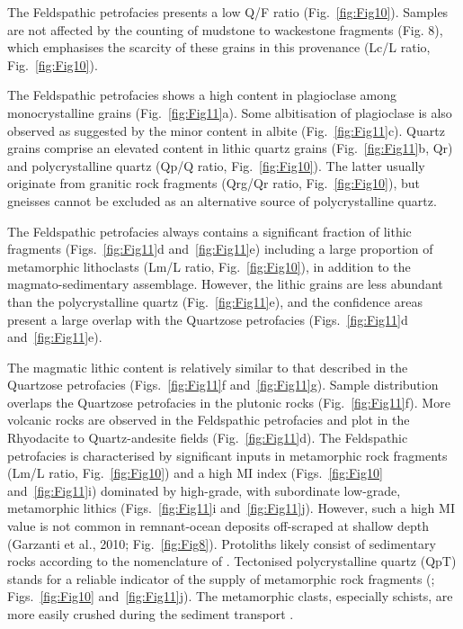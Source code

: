 \documentclass[twoside]{article}
\begin{document}
The Feldspathic petrofacies presents a low Q/F ratio (Fig.~\ref{fig:Fig10}). Samples are not affected by the counting of mudstone to wackestone fragments (Fig. 8), which emphasises the scarcity of these grains in this provenance (Lc/L ratio, Fig.~\ref{fig:Fig10}).\par
\medskip
The Feldspathic petrofacies shows a high content in plagioclase among monocrystalline grains (Fig.~\ref{fig:Fig11}a). Some albitisation of plagioclase \citep{Morad2000} is also observed as suggested by the minor content in albite (Fig.~\ref{fig:Fig11}c). Quartz grains comprise an elevated content in lithic quartz grains (Fig.~\ref{fig:Fig11}b, Qr) and polycrystalline quartz (Qp/Q ratio, Fig.~\ref{fig:Fig10}). The latter usually originate from granitic rock fragments (Qrg/Qr ratio, Fig.~\ref{fig:Fig10}), but gneisses cannot be excluded as an alternative source of polycrystalline quartz.\par
\medskip
The Feldspathic petrofacies always contains a significant fraction of lithic fragments (Figs.~\ref{fig:Fig11}d and~\ref{fig:Fig11}e) including a large proportion of metamorphic lithoclasts (Lm/L ratio, Fig.~\ref{fig:Fig10}), in addition to the magmato-sedimentary assemblage. However, the lithic grains are less abundant than the polycrystalline quartz (Fig.~\ref{fig:Fig11}e), and the confidence areas present a large overlap with the Quartzose petrofacies (Figs.~\ref{fig:Fig11}d and~\ref{fig:Fig11}e).\par
\medskip
The magmatic lithic content is relatively similar to that described in the Quartzose petrofacies (Figs.~\ref{fig:Fig11}f and~\ref{fig:Fig11}g). Sample distribution overlaps the Quartzose petrofacies in the plutonic rocks (Fig.~\ref{fig:Fig11}f). More volcanic rocks are observed in the Feldspathic petrofacies and plot in the Rhyodacite to Quartz-andesite fields (Fig.~\ref{fig:Fig11}d). The Feldspathic petrofacies is characterised by significant inputs in metamorphic rock fragments (Lm/L ratio, Fig.~\ref{fig:Fig10}) and a high MI index (Figs.~\ref{fig:Fig10} and~\ref{fig:Fig11}i) dominated by high-grade, with subordinate low-grade, metamorphic lithics (Figs.~\ref{fig:Fig11}i and~\ref{fig:Fig11}j). However, such a high MI value is not common in remnant-ocean deposits off-scraped at shallow depth (Garzanti et al., 2010; Fig.~\ref{fig:Fig8}). Protoliths likely consist of sedimentary rocks according to the nomenclature of \citep{Garzanti2003}. Tectonised polycrystalline quartz (QpT) stands for a reliable indicator of the supply of metamorphic rock fragments (\citealp{Young1976}; Figs.~\ref{fig:Fig10} and~\ref{fig:Fig11}j). The metamorphic clasts, especially schists, are more easily crushed during the sediment transport \cite{Picard2007}.
\end{document}
